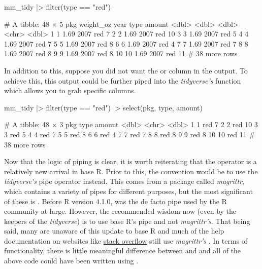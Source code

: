 \begin{inR}
mm_tidy |> filter(type == "red")
\end{inR}
\begin{outR}
# A tibble: 48 × 5
     pkg weight_oz  year type  amount
   <dbl>     <dbl> <dbl> <chr>  <dbl>
 1     1      1.69  2007 red        7
 2     2      1.69  2007 red       10
 3     3      1.69  2007 red        5
 4     4      1.69  2007 red        7
 5     5      1.69  2007 red        8
 6     6      1.69  2007 red        4
 7     7      1.69  2007 red        7
 8     8      1.69  2007 red        8
 9     9      1.69  2007 red        8
10    10      1.69  2007 red       11
# 38 more rows
\end{outR}

In addition to this, suppose you did not want the  or  column in the output. To achieve this, this output could be further piped into the \textit{tidyverse's}  function which allows you to grab specific columns.

\begin{inR}
mm_tidy |> 
  filter(type == "red") |>
  select(pkg, type, amount)
\end{inR}
\begin{outR}
# A tibble: 48 × 3
     pkg type  amount
   <dbl> <chr>  <dbl>
 1     1 red        7
 2     2 red       10
 3     3 red        5
 4     4 red        7
 5     5 red        8
 6     6 red        4
 7     7 red        7
 8     8 red        8
 9     9 red        8
10    10 red       11
# 38 more rows
\end{outR}

Now that the logic of piping is clear, it is worth reiterating that the \R{|>} operator is a relatively new arrival in base R. Prior to this, the convention would be to use the \textit{tidyverse's} pipe operator \R{\%>\%} instead. This comes from a package called \textit{magrittr}, which contains a variety of pipes for different purposes, but the most significant of these is \R{\%>\%}. Before R version  4.1.0, \R{\%>\%} was the de facto pipe used by the R community at large. However, the recommended wisdom now (even by the keepers of the \textit{tidyverse}) is to use base R's pipe and not \textit{magrittr's}. That being said, many are unaware of this update to base R and much of the help documentation on websites like \href{https://stackoverflow.com/}{stack overflow} still use \textit{magrittr's} \R{\%>\%}. In terms of functionality, there is little meaningful difference between \R{|>} and \R{\%>\%} and all of the above code could have been written using \R{\%>\%}.

